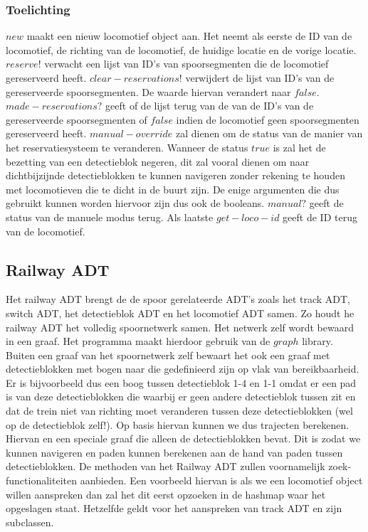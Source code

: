 \documentclass{article}
\begin{document}
\subsubsection{Toelichting}
$new$ maakt een nieuw locomotief object aan. Het neemt als eerste de ID van de locomotief, de richting van de locomotief, de huidige locatie en de vorige locatie. 
$reserve!$ verwacht een lijst van ID's van spoorsegmenten die de locomotief gereserveerd heeft. $clear-reservations!$ verwijdert de lijst van ID's van de gereserveerde
spoorsegmenten. De waarde hiervan verandert naar $false$. $made-reservations?$ geeft of de lijst terug van de van de ID's van de gereserveerde spoorsegmenten of $false$ indien de 
locomotief geen spoorsegmenten gereserveerd heeft.
$manual-override$ zal dienen om de status van de manier van het reservatiesysteem te veranderen. Wanneer de status $true$ is zal het de bezetting van een detectieblok negeren, 
dit zal vooral dienen om naar dichtbijzijnde detectieblokken te kunnen navigeren zonder rekening te houden met locomotieven die te dicht in de buurt zijn. De enige argumenten
die dus gebruikt kunnen worden hiervoor zijn dus ook de booleans. 
$manual?$ geeft de status van de manuele modus terug. Als laatste $get-loco-id$ geeft de ID terug van de locomotief. 
\subsection{Railway ADT}
Het railway ADT brengt de de spoor gerelateerde ADT's zoals het track ADT, switch ADT, het detectieblok ADT en het locomotief ADT samen. 
Zo houdt he railway ADT het volledig spoornetwerk samen. Het netwerk zelf wordt bewaard in een graaf. Het programma maakt hierdoor gebruik van de $graph$ library. 
Buiten een graaf van het spoornetwerk zelf bewaart het ook een graaf met detectieblokken met bogen naar die gedefinieerd zijn op vlak van bereikbaarheid. Er is bijvoorbeeld dus een boog tussen
detectieblok 1-4 en 1-1 omdat er een pad is van deze detectieblokken die waarbij er geen andere detectieblok tussen zit en dat de trein niet van richting moet veranderen tussen deze detectieblokken (wel op de detectieblok zelf!). Op basis hiervan kunnen we dus trajecten berekenen. Hiervan en een speciale graaf die alleen de detectieblokken bevat. Dit is zodat we kunnen
navigeren en paden kunnen berekenen aan de hand van paden tussen detectieblokken. De methoden van het Railway ADT zullen voornamelijk zoek-functionaliteiten aanbieden. 
Een voorbeeld hiervan is als we een locomotief object willen aanspreken dan zal het dit eerst opzoeken in de hashmap waar het opgeslagen staat. Hetzelfde geldt voor het 
aanspreken van track ADT en zijn subclassen. 
\end{document}
